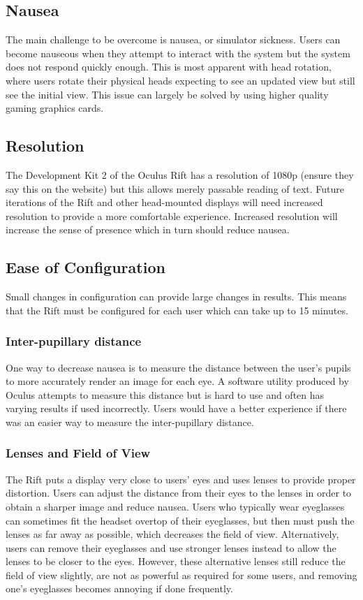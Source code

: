 \documentclass[conference]{IEEEtran}
\begin{document}
\subsection{Nausea}
The main challenge to be overcome is nausea, or simulator sickness.
Users can become nauseous when they attempt to interact with the system but the system does not respond quickly enough.
This is most apparent with head rotation, where users rotate their physical heads expecting to see an updated view but still see the initial view.
This issue can largely be solved by using higher quality gaming graphics cards.

\subsection{Resolution}
The Development Kit 2 of the Oculus Rift has a resolution of 1080p (ensure they say this on the website) but this allows merely passable reading of text. 
Future iterations of the Rift and other head-mounted displays will need increased resolution to provide a more comfortable experience.
Increased resolution will increase the sense of presence which in turn should reduce nausea.

\subsection{Ease of Configuration}
Small changes in configuration can provide large changes in results.
This means that the Rift must be configured for each user which can take up to 15 minutes.

\subsubsection{Inter-pupillary distance}
One way to decrease nausea is to measure the distance between the user's pupils to more accurately render an image for each eye.
A software utility produced by Oculus attempts to measure this distance but is hard to use and often has varying results if used incorrectly.
Users would have a better experience if there was an easier way to measure the inter-pupillary distance.

\subsubsection{Lenses and Field of View}
The Rift puts a display very close to users' eyes and uses lenses to provide proper distortion.
Users can adjust the distance from their eyes to the lenses in order to obtain a sharper image and reduce nausea.
Users who typically wear eyeglasses can sometimes fit the headset overtop of their eyeglasses, but then must push the lenses as far away as possible, which decreases the field of view.
Alternatively, users can remove their eyeglasses and use stronger lenses instead to allow the lenses to be closer to the eyes.
However, these alternative lenses still reduce the field of view slightly, are not as powerful as required for some users, and removing one's eyeglasses becomes annoying if done frequently.
\end{document}
